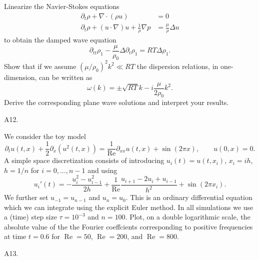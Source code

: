 \documentclass[12pt]{exam}
\newcommand{\del}{\partial}
\begin{document}
\begin{questions}
    
    \question Linearize the Navier-Stokes equations
    \begin{align*}
        \del_t \rho + \nabla \cdot (\rho u) &= 0 \\
        \del_t \rho + (u \cdot \nabla) u + \frac{1}{\rho} \nabla p &= \frac{\mu}{\rho} \Delta u
    \end{align*}
    to obtain the damped wave equation
    \begin{equation*}
        \del_{tt} \rho_1 - \frac{\mu}{\rho_0} \Delta \del_t \rho_1 = RT \Delta \rho_1.
    \end{equation*}
    Show that if we assume $(\mu / \rho_0)^2 k^2 \ll RT$ the dispersion relations, in one-dimension, can be written as
    \begin{equation*}
        \omega(k) = \pm \sqrt{RT}k - i \frac{\mu}{2 \rho_0} k^2.
    \end{equation*}
    Derive the corresponding plane wave solutions and interpret your results.
    
    \begin{solution}
        A12.
    \end{solution}
    
    
    \question We consider the toy model
    \begin{equation*}
        \del_t u(t,x) + \frac{1}{2} \del_x(u^2(t,x)) = \frac{1}{\text{Re}} \del_{xx} u(t,x) + \sin(2 \pi x), \qquad u(0,x) = 0.
    \end{equation*}
    A simple space discretization consists of introducing $u_i(t) = u(t, x_i)$, $x_i = ih$, $h = 1/n$ for $i = 0, \ldots, n - 1$ and using
    \begin{equation*}
        u_i'(t) = - \frac{u_i^2 - u_{i-1}^2}{2h} + \frac{1}{\text{Re}} \frac{u_{i+1} - 2u_i + u_{i-1}}{h^2} + \sin(2 \pi x_i).
    \end{equation*}
    We further set $u_{-1} = u_{n-1}$ and $u_n = u_0$. This is an ordinary differential equation which we can integrate using the explicit Euler method. In all simulations we use a (time) step size $\tau = 10^{-3}$ and $n = 100$. \newline
    Plot, on a double logarithmic scale, the absolute value of the the Fourier coeffcients corresponding to positive frequencies at time $t = 0.6$ for $\operatorname{Re} = 50$, $\operatorname{Re} = 200$, and $\operatorname{Re} = 800$.
    
    \begin{solution}
        A13.
    \end{solution}
    
\end{questions}
\end{document}

